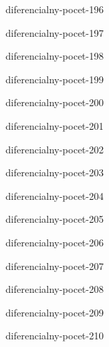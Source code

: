 \begin{defproblem}{diferencialny-pocet-196}

\end{defproblem}

\begin{defproblem}{diferencialny-pocet-197}

\end{defproblem}

\begin{defproblem}{diferencialny-pocet-198}

\end{defproblem}

\begin{defproblem}{diferencialny-pocet-199}

\end{defproblem}

\begin{defproblem}{diferencialny-pocet-200}

\end{defproblem}

\begin{defproblem}{diferencialny-pocet-201}

\end{defproblem}

\begin{defproblem}{diferencialny-pocet-202}

\end{defproblem}

\begin{defproblem}{diferencialny-pocet-203}

\end{defproblem}

\begin{defproblem}{diferencialny-pocet-204}

\end{defproblem}

\begin{defproblem}{diferencialny-pocet-205}

\end{defproblem}

\begin{defproblem}{diferencialny-pocet-206}

\end{defproblem}

\begin{defproblem}{diferencialny-pocet-207}

\end{defproblem}

\begin{defproblem}{diferencialny-pocet-208}

\end{defproblem}

\begin{defproblem}{diferencialny-pocet-209}

\end{defproblem}

\begin{defproblem}{diferencialny-pocet-210}

\end{defproblem}